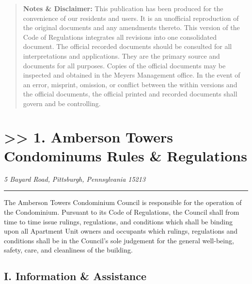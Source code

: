 \documentclass[
  14pt,
]{book}
\begin{document}
\begin{quote}
\textbf{Notes \& Disclaimer:} This publication has been produced for the convenience of our residents and users. It is an unofficial reproduction of the original documents and any amendments thereto. This version of the Code of Regulations integrates all revisions into one consolidated document. The official recorded documents should be consulted for all interpretations and applications. They are the primary source and documents for all purposes. Copies of the official documents may be inspected and obtained in the Meyers Management office. In the event of an error, misprint, omission, or conflict between the within versions and the official documents, the official printed and recorded documents shall govern and be controlling.
\end{quote}

\hypertarget{amberson-towers-condominums-rules-regulations}{%
\chapter*{\texorpdfstring{\textgreater\textgreater{} 1. Amberson Towers Condominums Rules \& Regulations}{\textgreater\textgreater{} 1. Amberson Towers Condominums   Rules \& Regulations}}\label{amberson-towers-condominums-rules-regulations}}

\emph{5 Bayard Road, }
\emph{Pittsburgh, Pennsylvania 15213}

\begin{center}\rule{0.5\linewidth}{0.5pt}\end{center}

The Amberson Towers Condominium Council is responsible for the operation of the Condominium. Pursuant to its Code of Regulations, the Council shall from time to time issue rulings, regulations, and conditions which shall be binding upon all Apartment Unit owners and occupants which rulings, regulations and conditions shall be in the Council's sole judgement for the general well-being, safety, care, and cleanliness of the building.

\hypertarget{i.-information-assistance}{%
\section*{I. Information \& Assistance}\label{i.-information-assistance}}
\end{document}
